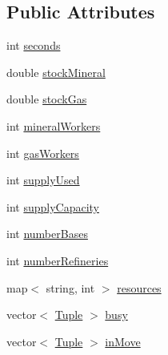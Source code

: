 \subsection*{Public Attributes}
\begin{DoxyCompactItemize}
\item 
int \hyperlink{structghost_1_1BuildOrderObjective_1_1State_a0aa600bbcf11f69da073ee5f5df45c86}{seconds}
\item 
double \hyperlink{structghost_1_1BuildOrderObjective_1_1State_a0e53b3e6a66bbd9ce0f9e08513796610}{stock\-Mineral}
\item 
double \hyperlink{structghost_1_1BuildOrderObjective_1_1State_af0fa35ae9792f888a68d588507de4d65}{stock\-Gas}
\item 
int \hyperlink{structghost_1_1BuildOrderObjective_1_1State_aa4de47baa8f94de50faec04b91e365c3}{mineral\-Workers}
\item 
int \hyperlink{structghost_1_1BuildOrderObjective_1_1State_a17467d1d4d7d6a8f7ccfa96ae90a6bd8}{gas\-Workers}
\item 
int \hyperlink{structghost_1_1BuildOrderObjective_1_1State_a5eabdc60e3ea9d4063b6545741215fc1}{supply\-Used}
\item 
int \hyperlink{structghost_1_1BuildOrderObjective_1_1State_a2699219ad3dbb62ac5b5ec1fb12a8318}{supply\-Capacity}
\item 
int \hyperlink{structghost_1_1BuildOrderObjective_1_1State_a54d467ee421d3cdd60277fd2a813f46e}{number\-Bases}
\item 
int \hyperlink{structghost_1_1BuildOrderObjective_1_1State_aca273265810b45bd356a1c81f71c3a4b}{number\-Refineries}
\item 
map$<$ string, int $>$ \hyperlink{structghost_1_1BuildOrderObjective_1_1State_ada76e810fe40251c861548bee83df73f}{resources}
\item 
vector$<$ \hyperlink{structghost_1_1BuildOrderObjective_1_1Tuple}{Tuple} $>$ \hyperlink{structghost_1_1BuildOrderObjective_1_1State_a451d864f0e411c953f2e31f8048b75c6}{busy}
\item 
vector$<$ \hyperlink{structghost_1_1BuildOrderObjective_1_1Tuple}{Tuple} $>$ \hyperlink{structghost_1_1BuildOrderObjective_1_1State_a9083a73ad0675c4b96c199416aa843d5}{in\-Move}
\end{DoxyCompactItemize}


